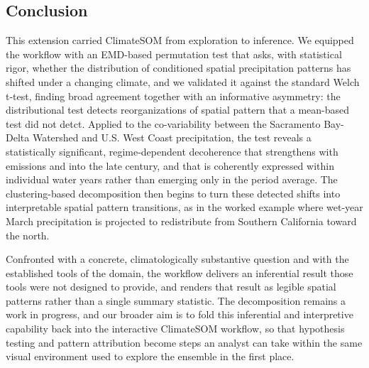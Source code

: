 \subsection{Conclusion}
\label{subsec:agu-real-conclusion}
This extension carried ClimateSOM from exploration to inference.
%
We equipped the workflow with an EMD-based permutation test that asks, with statistical rigor, whether the distribution of conditioned spatial precipitation patterns has shifted under a changing climate, and we validated it against the standard Welch t-test, finding broad agreement together with an informative asymmetry: the distributional test detects reorganizations of spatial pattern that a mean-based test did not detct.
%
Applied to the co-variability between the Sacramento Bay-Delta Watershed and U.S. West Coast precipitation, the test reveals a statistically significant, regime-dependent decoherence that strengthens with emissions and into the late century, and that is coherently expressed within individual water years rather than emerging only in the period average.
%
The clustering-based decomposition then begins to turn these detected shifts into interpretable spatial pattern transitions, as in the worked example where wet-year March precipitation is projected to redistribute from Southern California toward the north.

%
Confronted with a concrete, climatologically substantive question and with the established tools of the domain, the workflow delivers an inferential result those tools were not designed to provide, and renders that result as legible spatial patterns rather than a single summary statistic.
%
The decomposition remains a work in progress, and our broader aim is to fold this inferential and interpretive capability back into the interactive ClimateSOM workflow, so that hypothesis testing and pattern attribution become steps an analyst can take within the same visual environment used to explore the ensemble in the first place.
